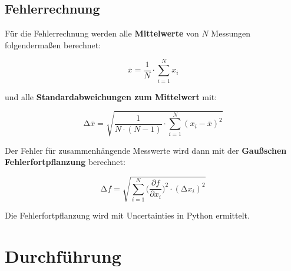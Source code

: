 
\subsection{Fehlerrechnung}
Für die Fehlerrechnung werden alle \textbf{Mittelwerte} von $N$ Messungen folgendermaßen berechnet:

\begin{equation}
	\overline{x} = \frac{1}{N} \cdot \sum_{i=1}^N x_i
	\label{eqn:Mittelwert}
\end{equation}

und alle \textbf{Standardabweichungen zum Mittelwert} mit:

\begin{equation}
	\increment\overline{x} = \sqrt{\frac{1}{N\cdot(N-1)}\cdot\sum_{i=1}^N (x_i-\overline{x})^2}
	\label{eqn:St_Mittelwert}
\end{equation}

Der Fehler für zusammenhängende Messwerte wird dann mit der \textbf{Gaußschen Fehlerfortpflanzung} berechnet:

\begin{equation}
	\increment{f} = \sqrt{ \sum_{i = 1}^{N}  \biggl(\frac{\partial{f}}{\partial{x_i}}\biggr)^2\cdot(\increment{x_i})^2}
	\label{eqn:Gauss}
\end{equation}

Die Fehlerfortpflanzung wird mit Uncertainties in Python \cite{uncertainties} ermittelt.


\section{Durchführung \cite{man}}

